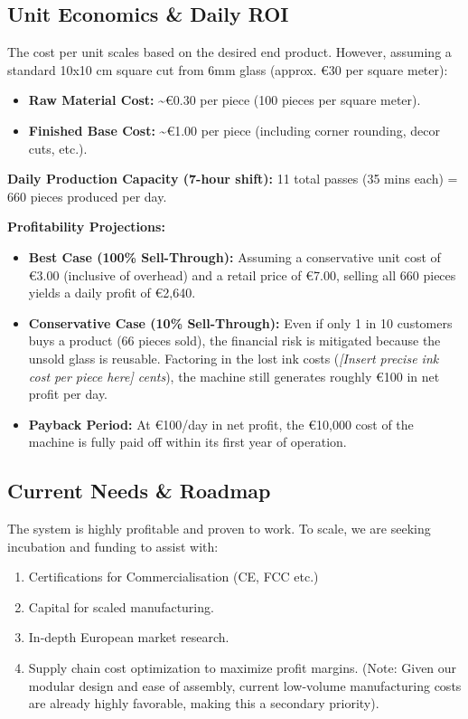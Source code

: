 \documentclass[11pt, a4paper]{article}
\begin{document}
\subsection*{Unit Economics \& Daily ROI}
The cost per unit scales based on the desired end product. However, assuming a standard 10x10 cm square cut from 6mm glass (approx. €30 per square meter):

\begin{itemize}
    \item \textbf{Raw Material Cost:} \textasciitilde€0.30 per piece (100 pieces per square meter).
    \item \textbf{Finished Base Cost:} \textasciitilde€1.00 per piece (including corner rounding, decor cuts, etc.).
\end{itemize}

\textbf{Daily Production Capacity (7-hour shift):}
11 total passes (35 mins each) = 660 pieces produced per day.

\textbf{Profitability Projections:}
\begin{itemize}
    \item \textbf{Best Case (100\% Sell-Through):} Assuming a conservative unit cost of €3.00 (inclusive of overhead) and a retail price of €7.00, selling all 660 pieces yields a daily profit of €2,640.
    \item \textbf{Conservative Case (10\% Sell-Through):} Even if only 1 in 10 customers buys a product (66 pieces sold), the financial risk is mitigated because the unsold glass is reusable. Factoring in the lost ink costs (\textit{[Insert precise ink cost per piece here] cents}), the machine still generates roughly €100 in net profit per day.
    \item \textbf{Payback Period:} At €100/day in net profit, the €10,000 cost of the machine is fully paid off within its first year of operation.
\end{itemize}

\subsection*{Current Needs \& Roadmap}
The system is highly profitable and proven to work. To scale, we are seeking incubation and funding to assist with:
\begin{enumerate}
    \item Certifications for Commercialisation (CE, FCC etc.)
    \item Capital for scaled manufacturing.
    \item In-depth European market research.
    \item Supply chain cost optimization to maximize profit margins. (Note: Given our modular design and ease of assembly, current low-volume manufacturing costs are already highly favorable, making this a secondary priority).
\end{enumerate}
\end{document}

